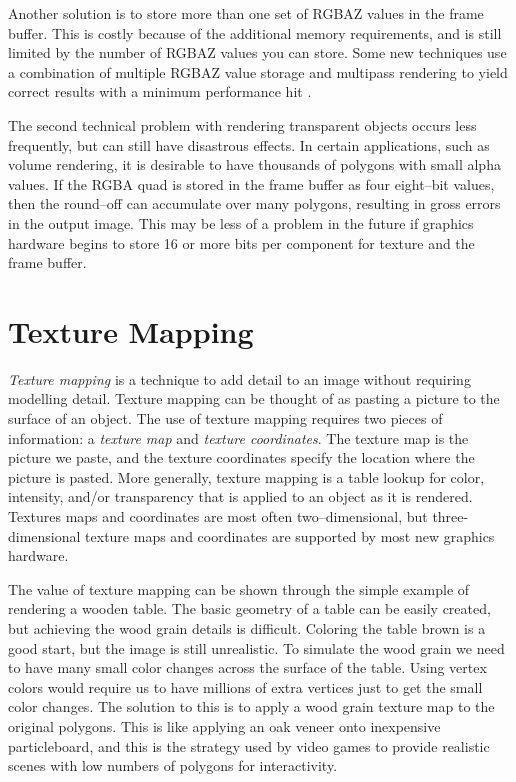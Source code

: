 Another solution is to store more than one set of RGBAZ values in the frame buffer. This is costly because of the additional memory requirements, and is still limited by the number of RGBAZ values you can store. Some new techniques use a combination of multiple RGBAZ value storage and multipass rendering to yield correct results with a minimum performance hit \cite{Hodges92}.

The second technical problem with rendering transparent objects occurs less frequently, but can still have disastrous effects. In certain applications, such as volume rendering, it is desirable to have thousands of polygons with small alpha values. If the RGBA quad is stored in the frame buffer as four eight--bit values, then the round--off can accumulate over many polygons, resulting in gross errors in the output image. This may be less of a problem in the future if graphics hardware begins to store 16 or more bits per component for texture and the frame buffer.

\section{Texture Mapping}

\emph{Texture mapping} is a technique to add detail to an image without requiring modelling detail. Texture mapping can be thought of as pasting a picture to the surface of an object. The use of texture mapping requires two pieces of information: a \emph{texture map} and \emph{texture coordinates}. The texture map is the picture we paste, and the texture coordinates specify the location where the picture is pasted. More generally, texture mapping is a table lookup for color, intensity, and/or transparency that is applied to an object as it is rendered. Textures maps and coordinates are most often two--dimensional, but three-dimensional texture maps and coordinates are supported by most new graphics hardware.

The value of texture mapping can be shown through the simple example of rendering a wooden table. The basic geometry of a table can be easily created, but achieving the wood grain details is difficult. Coloring the table brown is a good start, but the image is still unrealistic. To simulate the wood grain we need to have many small color changes across the surface of the table. Using vertex colors would require us to have millions of extra vertices just to get the small color changes. The solution to this is to apply a wood grain texture map to the original polygons. This is like applying an oak veneer onto inexpensive particleboard, and this is the strategy used by video games to provide realistic scenes with low numbers of polygons for interactivity.

